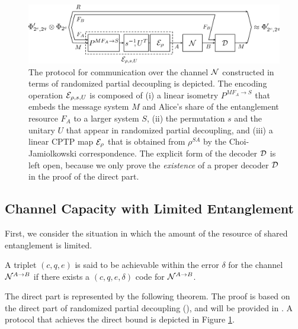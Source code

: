 \documentclass[journal]{IEEEtran}
\begin{document}
\begin{figure}[th!]
\begin{center}
\includegraphics[bb={0 40 1224 286}, scale=0.3]{figure18.pdf}
\end{center}
\caption{
The protocol for communication over the channel ${\mathcal N}$ constructed in terms of randomized partial decoupling is depicted.
The encoding operation ${\mathcal E}_{\rho,s,U}$ is composed of (i) a linear isometry $P^{MF_A\rightarrow S}$ that embeds the message system $M$ and Alice's share of the entanglement resource $F_A$ to a larger system $S$, (ii) the permutation $s$ and the unitary $U$ that appear in randomized partial decoupling, and (iii) a linear CPTP map ${\mathcal E}_\rho$ that is obtained from $\rho^{SA}$ by the Choi-Jamiolkowski correspondence. 
The explicit form of the decoder ${\mathcal D}$ is left open, because we only prove the {\it existence} of a proper decoder ${\mathcal D}$ in the proof of the direct part.
}
\label{fig:directprotocol}
\end{figure}

\subsection{Channel Capacity with Limited Entanglement}


First, we consider the situation in which the amount of the resource of shared entanglement is limited.

A triplet $(c,q,e)$ is said to be achievable within the error $\delta$ for the channel ${\mathcal N}^{A\rightarrow B}$ if there exists a $(c,q,e,\delta)$ code for ${\mathcal N}^{A\rightarrow B}$.
\edfn

\noindent
The direct part is represented by the following theorem.  
The proof is based on the direct part of randomized partial decoupling (), and will be provided in .
A protocol that achieves the direct bound is depicted in Figure \ref{fig:directprotocol}.
\end{document}
